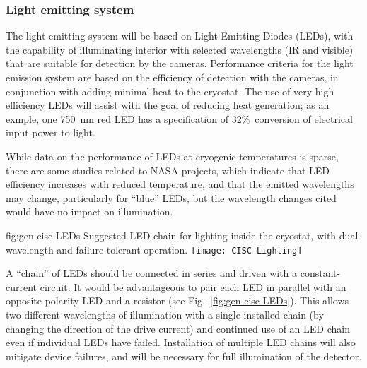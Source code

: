 \subsubsection{Light emitting system}
The light emitting system will be based on Light-Emitting Diodes
(LEDs), with the capability of illuminating interior with selected
wavelengths (IR and visible) that are suitable for detection by the
cameras.  Performance criteria for the light emission system are based
on the efficiency of detection with the cameras, in conjunction with
adding minimal heat to the cryostat. The use of very high efficiency
LEDs will assist with the goal of reducing heat generation; as an
exmple, one \SI{750}{nm} red LED has a specification of
32\%\ conversion of electrical input power to light.

While data on the performance of LEDs at cryogenic temperatures is sparse,
there are some studies related to NASA projects\cite{Carron:2017zzz}, which
indicate that LED efficiency increases with reduced temperature,
and that the emitted wavelengths may change, particularly for ``blue'' LEDs,
but the wavelength changes cited would have no impact on illumination.

\begin{dunefigure}{fig:gen-cisc-LEDs}
  {Suggested LED chain for lighting inside the cryostat, with
    dual-wavelength and failure-tolerant operation.}
\texttt{[image: CISC-Lighting]}
\end{dunefigure}

A ``chain'' of LEDs should be connected in series and driven with a
constant-current circuit. It would be advantageous to pair each
LED in parallel with an opposite polarity LED and a resistor
(see Fig.~\ref{fig:gen-cisc-LEDs}).
This allows two different wavelengths of illumination with a single installed
chain (by changing the direction of the drive current) and 
continued use of an LED chain even if individual LEDs have failed.
Installation of multiple LED chains will also mitigate device failures,
and will be necessary for full illumination of the detector.
